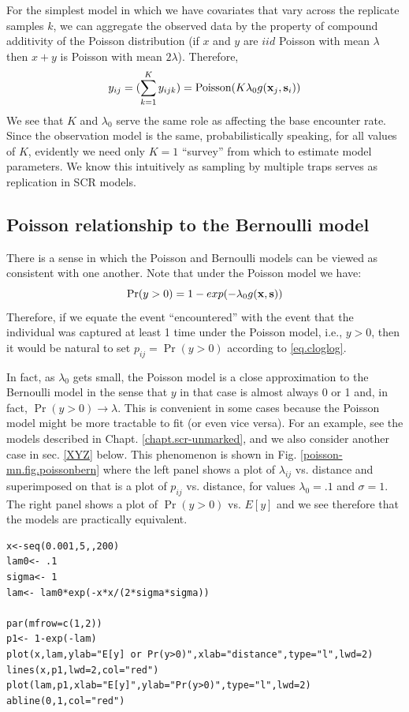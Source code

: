 For the simplest model in which we have covariates that vary across
the replicate samples $k$, we can aggregate the observed data by the
property of compound additivity of the Poisson distribution (if $x$ and
$y$ are $iid$ Poisson with mean $\lambda$ then $x+y$ is Poisson with
mean $2\lambda$). Therefore,
\[
y_{ij} = (\sum_{k=1}^{K} y_{ijk}) =  \mbox{Poisson}(K  \lambda_{0} 
g({\bf x}_{j},{\bf s}_{i}) )
\]
We see that $K$ and $\lambda_{0}$ serve the same role as affecting the
base encounter rate. Since the observation model is the same,
probabilistically speaking, for all values of $K$, evidently we need
only $K=1$ ``survey'' from which to estimate model parameters. We know
this intuitively as sampling by multiple traps serves as replication
in SCR models.


\subsection{Poisson relationship to the Bernoulli model}

There is a sense in which the Poisson and Bernoulli models can
be viewed as consistent with one another. Note that under the Poisson
model we have:
\begin{equation}
 \Pr(y>0) = 1-exp(-\lambda_{0} g({\bf x},{\bf s}))
\label{eq.cloglog}
\end{equation}
Therefore, if we equate the event ``encountered'' with the event that
the individual was captured at least 1 time under the Poisson model,
i.e., $y>0$, then it would be natural to set $p_{ij} = \Pr(y>0)$
according to \ref{eq.cloglog}.

In fact, as $\lambda_0$ gets small, the Poisson model is a close approximation
to the Bernoulli model in the sense that $y$ in that case is almost
always 0 or 1 and, in fact, $\Pr(y>0) \rightarrow \lambda$.  This is
convenient in some cases because the Poisson model might be more
tractable to fit (or even vice versa). For an example, see the models
described in Chapt. \ref{chapt.scr-unmarked}, and we also consider
another case in sec. \ref{XYZ} below.
This phenomenon is shown in  Fig. 
\ref{poisson-mn.fig.poissonbern} where
the left panel shows a plot of $\lambda_{ij}$ vs. distance and
superimposed on that is a plot of $p_{ij}$ vs. distance, for values
$\lambda_{0} = .1$ and $\sigma = 1$. The right panel shows a plot of
$\Pr(y>0)$ vs. $E[y]$ and we see therefore that the models are
practically equivalent. 

\begin{verbatim}
x<-seq(0.001,5,,200)
lam0<- .1
sigma<- 1
lam<- lam0*exp(-x*x/(2*sigma*sigma))

par(mfrow=c(1,2))
p1<- 1-exp(-lam)
plot(x,lam,ylab="E[y] or Pr(y>0)",xlab="distance",type="l",lwd=2)
lines(x,p1,lwd=2,col="red")
plot(lam,p1,xlab="E[y]",ylab="Pr(y>0)",type="l",lwd=2)
abline(0,1,col="red")
\end{verbatim}


